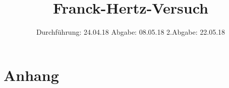 

\subject{V601}
\title{Franck-Hertz-Versuch}
\date{%
  Durchführung: 24.04.18
  \hspace{3em}
  Abgabe: 08.05.18
  \hspace{10em}
  2.Abgabe: 22.05.18
}



\maketitle
\thispagestyle{empty}
\tableofcontents
\newpage






\printbibliography{}

\section{Anhang}
\label{sec:Anhang}



